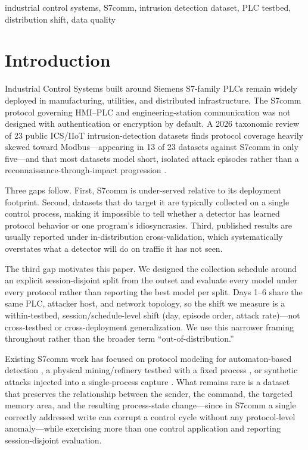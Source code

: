 \documentclass[conference]{IEEEtran}
\begin{document}
\begin{IEEEkeywords}
industrial control systems, S7comm, intrusion detection dataset, PLC testbed, distribution shift, data quality
\end{IEEEkeywords}

\section{Introduction}

Industrial Control Systems built around Siemens S7-family PLCs remain widely deployed in manufacturing,
utilities, and distributed infrastructure. The S7comm protocol governing HMI--PLC and engineering-station
communication was not designed with authentication or encryption by default. A 2026 taxonomic review of 23
public ICS/IIoT intrusion-detection datasets finds protocol coverage heavily skewed toward
Modbus---appearing in 13 of 23 datasets against S7comm in only five---and that most datasets model short,
isolated attack episodes rather than a reconnaissance-through-impact progression \cite{b1}.

Three gaps follow. First, S7comm is under-served relative to its deployment footprint. Second, datasets
that do target it are typically collected on a single control process, making it impossible to tell
whether a detector has learned protocol behavior or one program's idiosyncrasies. Third, published
results are usually reported under in-distribution cross-validation, which systematically overstates what
a detector will do on traffic it has not seen.

The third gap motivates this paper. We designed the collection schedule around an explicit
session-disjoint split from the outset and evaluate every model under every protocol rather than
reporting the best model per split. Days 1--6 share the same PLC, attacker host, and network topology, so
the shift we measure is a within-testbed, session/schedule-level shift (day, episode order, attack
rate)---not cross-testbed or cross-deployment generalization. We use this narrower framing throughout
rather than the broader term ``out-of-distribution.''

Existing S7comm work has focused on protocol modeling for automaton-based detection \cite{b2}, a physical
mining/refinery testbed with a fixed process \cite{b3}, or synthetic attacks injected into a
single-process capture \cite{b4}. What remains rare is a dataset that preserves the relationship between
the sender, the command, the targeted memory area, and the resulting process-state change---since in
S7comm a single correctly addressed write can corrupt a control cycle without any protocol-level
anomaly---while exercising more than one control application and reporting session-disjoint evaluation.
\end{document}
